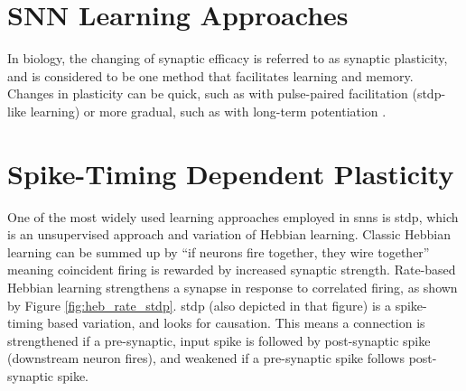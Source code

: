     
    \section{SNN Learning Approaches}
    In biology, the changing of synaptic efficacy is referred to as synaptic
    plasticity, and is considered to be one method that facilitates learning and
    memory. Changes in plasticity can be quick, such as with pulse-paired
    facilitation (\gls{stdp}-like learning) or more gradual, such as with long-term
    potentiation \parencite{ponulak_2011}.


    \section{Spike-Timing Dependent Plasticity}
    One of the most widely used learning approaches employed in \glspl{snn} is
    \gls{stdp}, which is an unsupervised approach and variation of Hebbian
    learning. Classic Hebbian learning can be summed up by ``if neurons fire
    together, they wire together'' meaning coincident firing is rewarded by
    increased synaptic strength. Rate-based Hebbian learning strengthens a
    synapse in response to correlated firing, as shown by Figure
    \ref{fig:heb_rate_stdp}. \Gls{stdp} (also depicted in that figure) is a
    spike-timing based variation, and looks for causation. This means a
    connection is strengthened if a pre-synaptic, input spike is followed by
    post-synaptic spike (downstream neuron fires), and weakened if a
    pre-synaptic spike follows post-synaptic spike.


